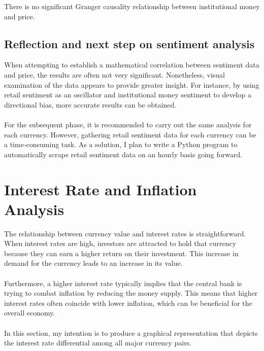 \documentclass{article}
\begin{document}
There is no significant Granger causality relationship between institutional money and price.


\subsection{Reflection and next step on sentiment analysis}
When attempting to establish a mathematical correlation between sentiment data and price, the results are often not very significant. Nonetheless, visual examination of the data appears to provide greater insight. For instance, by using retail sentiment as an oscillator and institutional money sentiment to develop a directional bias, more accurate results can be obtained.\\ \\ 
For the subsequent phase, it is recommended to carry out the same analysis for each currency. However, gathering retail sentiment data for each currency can be a time-consuming task. As a solution, I plan to write a Python program to automatically scrape retail sentiment data on an hourly basis going forward.


\section{Interest Rate and Inflation Analysis}
The relationship between currency value and interest rates is straightforward. When interest rates are high, investors are attracted to hold that currency because they can earn a higher return on their investment. This increase in demand for the currency leads to an increase in its value. \\ \\ 
Furthermore, a higher interest rate typically implies that the central bank is trying to combat inflation by reducing the money supply. This means that higher interest rates often coincide with lower inflation, which can be beneficial for the overall economy.\\ \\
In this section, my intention is to produce a graphical representation that depicts the interest rate differential among all major currency pairs. 
\end{document}
